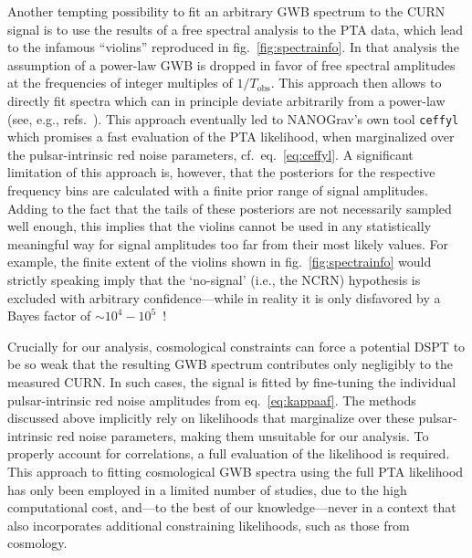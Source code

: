 Another tempting possibility to fit an arbitrary \ac{GWB} spectrum to the \ac{CURN} signal is to use the results of a free spectral analysis to the \ac{PTA} data, which lead to the infamous ``violins'' reproduced in fig.~\ref{fig:spectrainfo}. In that analysis the assumption of a power-law \ac{GWB} is dropped in favor of free spectral amplitudes at the  frequencies of integer multiples of $1/T_\text{obs}$. This approach then allows to directly fit spectra which can in principle deviate arbitrarily from a power-law (see, e.g., refs.~\cite{Ratzinger:2020koh,Wang:2022rjz, Wang:2022wwj, Ratzinger:2023umd}). This approach eventually led to \ac{NANOGrav}'s own tool \texttt{ceffyl}~\cite{Lamb:2023jls} which promises a fast evaluation of the \ac{PTA} likelihood, when marginalized over the pulsar-intrinsic red noise parameters, cf.~eq.~\eqref{eq:ceffyl}.  A significant limitation of this approach is, however, that the posteriors for the respective frequency bins are calculated with a finite prior range of signal amplitudes. Adding to the fact that the tails of these posteriors are not necessarily sampled well enough, this implies that the violins cannot be used in any statistically meaningful way for signal amplitudes too far from their most likely values. For example, the finite extent of the violins shown in fig.~\ref{fig:spectrainfo} would strictly speaking imply that the `no-signal' (i.e., the \acf{NCRN}) hypothesis is excluded with arbitrary confidence---while in reality it is only disfavored by a Bayes factor of $\sim10^4-10^5$~\cite{NANOGrav:2020bcs}!  

Crucially for our analysis, cosmological constraints can force a potential \ac{DSPT} to be so weak that the resulting \ac{GWB} spectrum contributes only negligibly to the measured \ac{CURN}. In such cases, the signal is fitted by fine-tuning the individual pulsar-intrinsic red noise amplitudes from eq.~\eqref{eq:kappaaf}. The methods discussed above implicitly rely on likelihoods that marginalize  over these pulsar-intrinsic red noise parameters, making them unsuitable for our analysis. To properly account for correlations, a full evaluation of the likelihood is required. This approach to fitting cosmological \ac{GWB} spectra using the full \ac{PTA} likelihood has only been employed in a limited number of studies\cite{Dandoy:2023jot, NANOGrav:2021flc}, due to the high computational cost, and---to the best of our knowledge---never in a context that also incorporates additional constraining likelihoods, such as those from cosmology.

